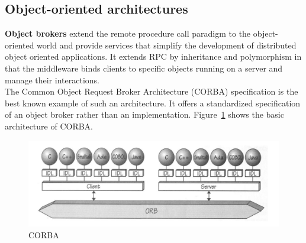 \subsection{Object-oriented architectures}
\textbf{Object brokers} extend the remote procedure call paradigm to the object-oriented world and provide services that simplify the development of distributed object oriented applications.
It extends RPC by inheritance and polymorphism in that the middleware binds clients to specific objects running on a server and manage their interactions.\\
The Common Object Request Broker Architecture (CORBA) specification is the best known example of such an architecture.
It offers a standardized specification of an object broker rather than an implementation.
Figure~\ref{fig:corba} shows the basic architecture of CORBA.
\begin{figure}[h]
  \centering
  \includegraphics[width=.8\textwidth]{images/corba.png}
  \caption{CORBA}\label{fig:corba}
\end{figure}

